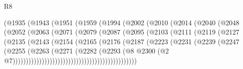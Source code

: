 \begin{lexlean}{R8}
\begin{coremodule}
                        (@1935
                          (@1943
                            (@1951
                              (@1959
                                (@1994
                                  (@2002
                                    (@2010
                                      (@2014
                                        (@2040
                                          (@2048
                                            (@2052
                                              (@2063
                                                (@2071
                                                  (@2079
                                                    (@2087
                                                      (@2095
                                                        (@2103
                                                          (@2111
                                                            (@2119
                                                              (@2127
                                                                (@2135
                                                                  (@2143
                                                                    (@2154
                                                                      (@2165
                                                                        (@2176
                                                                          (@2187
                                                                            (@2223
                                                                              (@2231
                                                                                (@2239
                                                                                  (@2247
                                                                                    (@2255
                                                                                      (@2263
                                                                                        (@2271
                                                                                          (@2282
                                                                                            (@2293
                                                                                              (@8
                                                                                                @2300
                                                                                                (@2
                                                                                                  @7)))))))))))))))))))))))))))))))))))))))))))))))

\end{coremodule}
\end{lexlean}
